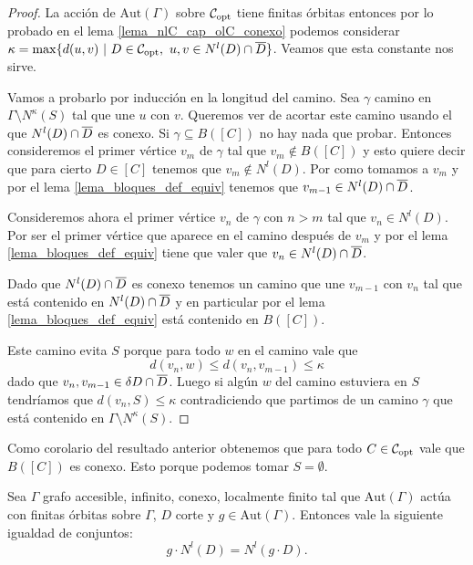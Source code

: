\documentclass[tesis.tex]{subfiles}
\newcommand{\aut}{\text{Aut}}
\begin{document}
\begin{proof}
	La acción de $\aut(\Gamma)$ sobre ${\cal C}_{\text{opt}}$ tiene finitas órbitas entonces por lo probado en el lema \ref{lema_nlC_cap_olC_conexo} podemos considerar 
	$\kappa = \max \{ d(u,v) \ | \ D \in \copt, \  u,v \in N^l(D) \cap \ol D  \}$. 	
	Veamos que esta constante nos sirve.
	
	Vamos a probarlo por inducción en la longitud del camino.
	Sea $\gamma$ camino en $\Gamma \setminus N^{\kappa}(S)$ tal que une $u$ con $v$.
	Queremos ver de acortar este camino usando el  que $N^{l}(D) \cap \overline D$ es conexo.
	Si $\gamma \subseteq B([C])$ no hay nada que probar.
	Entonces consideremos el primer vértice $v_m$ de $\gamma$ tal que $v_m \notin B([C])$ y esto quiere decir que para cierto $D \in [C]$ tenemos que $v_m \notin N^l(D)$.
	Por como tomamos a $v_{m}$ y por el lema \ref{lema_bloques_def_equiv} tenemos que $v_{m-1} \in N^l(D) \cap \overline D$.
	
		
	Consideremos ahora el primer vértice $v_n$ de $\gamma$ con $n > m$ tal que $v_n \in N^l(D)$.
	Por ser el primer vértice que aparece en el camino después de $v_{m}$ y por el lema \ref{lema_bloques_def_equiv} tiene que valer que $v_n \in N^l(D) \cap \overline D$.
	
	Dado que $N^l(D) \cap \overline D$ es conexo tenemos un camino que une $v_{m-1}$ con $v_n$ tal que está contenido en $N^l(D) \cap \overline D$ y en particular por el lema \ref{lema_bloques_def_equiv} está contenido en $B([C])$.
	
	Este camino evita $S$ porque para todo $w$ en el camino vale que 
	\[
		d(v_{n},w) \le d(v_{n},v_{m-1}) \le \kappa
	\]
	dado que $v_{n}, v_{m-1} \in \delta D \cap \overline D$.
	Luego si algún $w$ del camino estuviera en $S$ tendríamos que 
	$d(v_n,S) \le \kappa$ contradiciendo que partimos de un camino $\gamma$ que está contenido en $\Gamma \setminus N^{\kappa}(S)$.	
	
\end{proof}


\begin{obs}
	Como corolario del resultado anterior obtenemos que para todo $C \in {\cal C}_{\text{opt}}$ vale que $B([C])$ es conexo.
	Esto porque podemos tomar $S = \emptyset$.
\end{obs}

\begin{lema}\label{lema_accion_vecinos}
	Sea $\Gamma$ grafo accesible, infinito, conexo, localmente finito tal que $\aut(\Gamma)$ actúa con finitas órbitas sobre $\Gamma$, $D$ corte y $g \in \aut(\Gamma)$. 
	Entonces vale la siguiente igualdad de conjuntos:
	\[
		g \cdot N^l(D) = N^l(g \cdot D).
	\]
\end{lema}
\end{document}
